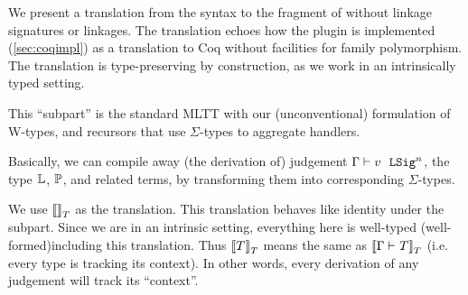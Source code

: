 We present a translation from the \TT syntax to the fragment of \TT without
linkage signatures or linkages.
The translation echoes how the \Lang plugin is implemented (\cref{sec:coqimpl})
as a translation to Coq without facilities for family polymorphism.
The translation is type-preserving by construction, as we work in an
intrinsically typed setting.

This ``subpart'' is the standard MLTT with our
(unconventional) formulation of W-types,
and recursors that use $\Sigma$-types to aggregate handlers.

Basically, we can compile away (the derivation of) judgement $ {\Gamma} \vdash {v} \ \ \texttt{LSig}^{n} $,
the type $\mathbb{L}$, $\mathbb{P}$, and related terms, by transforming them into
corresponding $\Sigma$-types.

 


We use ${{\llbracket {} \rrbracket}_T}$ as the translation. This translation behaves like identity
under the subpart. Since we are in an intrinsic setting, everything here
is well-typed (well-formed)including this translation. Thus
${{\llbracket {T} \rrbracket}_T}$ means the same as ${{\llbracket {\ensuremath{ {\Gamma} \vdash_{} {T} }} \rrbracket}_T}$
(i.e. every type is tracking its context). In other words, every
derivation of any judgement will track its ``context''. 


